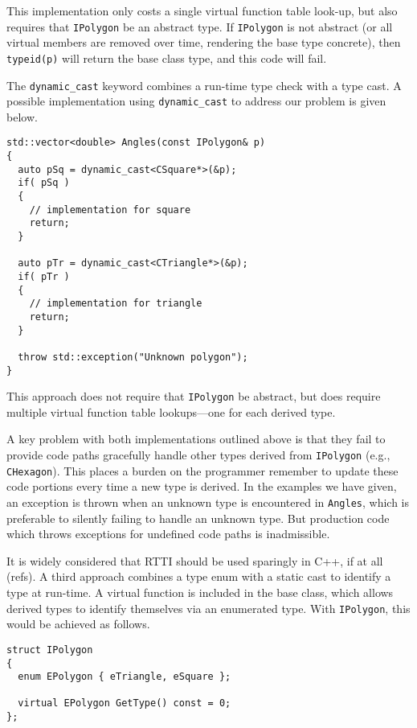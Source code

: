 \documentclass[10pt,a4paper,twocolumn]{article}
\newcommand\mycode[1]{{\small\texttt{#1}}}
\begin{document}
This implementation only costs a single virtual function table look-up, but also requires that \mycode{IPolygon} be an abstract type. If \mycode{IPolygon} is not abstract (or all virtual members are removed over time, rendering the base type concrete), then \mycode{typeid(p)} will return the base class type, and this code will fail.

The \mycode{dynamic\_cast} keyword combines a run-time type check with a type cast. A possible implementation using \mycode{dynamic\_cast} to address our problem is given below.

\begin{verbatim}
std::vector<double> Angles(const IPolygon& p)
{
  auto pSq = dynamic_cast<CSquare*>(&p);
  if( pSq )
  {
    // implementation for square
    return;
  }

  auto pTr = dynamic_cast<CTriangle*>(&p);
  if( pTr )	
  {
    // implementation for triangle
    return;
  }

  throw std::exception("Unknown polygon");
}
\end{verbatim}

This approach does not require that \mycode{IPolygon} be abstract, but does require multiple virtual function table lookups---one for each derived type.

A key problem with both implementations outlined above is that they fail to provide code paths gracefully handle other types derived from \mycode{IPolygon} (e.g., \mycode{CHexagon}). This places a burden on the programmer remember to update these code portions every time a new type is derived. In the examples we have given, an exception is thrown when an unknown type is encountered in \mycode{Angles}, which is preferable to silently failing to handle an unknown type. But production code which throws exceptions for undefined code paths is inadmissible.

It is widely considered that RTTI should be used sparingly in C++, if at all (refs). A third approach combines a type enum with a static cast to identify a type at run-time. A virtual function is included in the base class, which allows derived types to identify themselves via an enumerated type. With \mycode{IPolygon}, this would be achieved as follows.

\begin{verbatim}
struct IPolygon
{
  enum EPolygon { eTriangle, eSquare };
	
  virtual EPolygon GetType() const = 0;
};
\end{verbatim}
\end{document}
